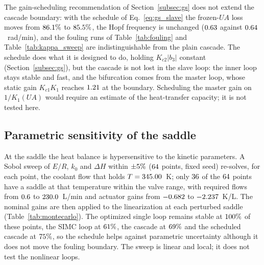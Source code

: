 The gain-scheduling recommendation of Section~\ref{subsec:gs} does not extend the cascade boundary: with the schedule of Eq.~\eqref{eq:gs_slave} the frozen-$UA$ loss moves from $86.1\%$ to $85.5\%$, the Hopf frequency is unchanged ($0.63$ against $0.64$~rad/min), and the fouling runs of Table~\ref{tab:fouling} and Table~\ref{tab:kappa_sweep} are indistinguishable from the plain cascade. The schedule does what it is designed to do, holding $K_{c2}|b_3|$ constant (Section~\ref{subsec:gs}), but the cascade is not lost in the slave loop: the inner loop stays stable and fast, and the bifurcation comes from the master loop, whose static gain $K_{c1}K_1$ reaches $1.21$ at the boundary. Scheduling the master gain on $1/K_1(UA)$ would require an estimate of the heat-transfer capacity; it is not tested here.

\subsection{Parametric sensitivity of the saddle}
\label{subsec:res_mc}
At the saddle the heat balance is hypersensitive to the kinetic parameters. A Sobol sweep of $E/R$, $k_0$ and $\Delta H$ within $\pm5\%$ ($64$ points, fixed seed) re-solves, for each point, the coolant flow that holds $T=345.00$~K; only $36$ of the $64$ points have a saddle at that temperature within the valve range, with required flows from $0.6$ to $230.0$~L/min and actuator gains from $-0.682$ to $-2.237$~K/L. The nominal gains are then applied to the linearization at each perturbed saddle (Table~\ref{tab:montecarlo}). The optimized single loop remains stable at $100\%$ of these points, the SIMC loop at $61\%$, the cascade at $69\%$ and the scheduled cascade at $75\%$, so the schedule helps against parametric uncertainty although it does not move the fouling boundary. The sweep is linear and local; it does not test the nonlinear loops.



